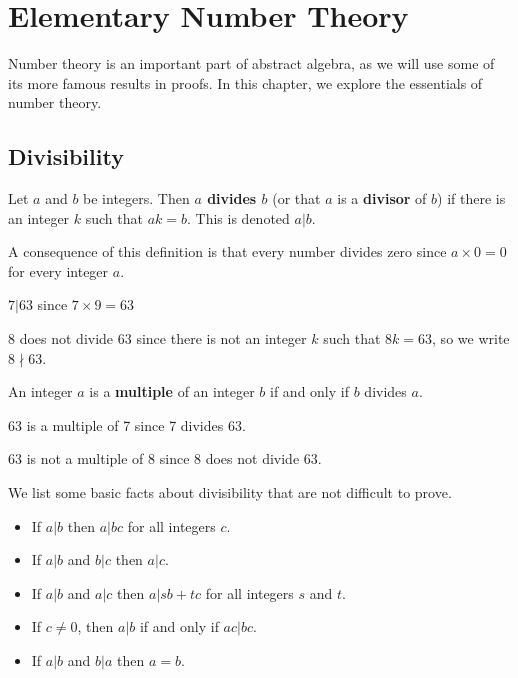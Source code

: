 \chapter{Elementary Number Theory}
Number theory is an important part of abstract algebra, as we will use some of its more famous results in proofs. In this chapter, we explore the essentials of number theory.

\section{Divisibility}
\begin{definition}
    Let $a$ and $b$ be integers. Then \textbf{$a$ divides $b$} (or that $a$ is a \textbf{divisor} of $b$) if there is an integer $k$ such that $ak = b$. This is denoted $a\vert b$.
\end{definition}
\begin{remark}
    A consequence of this definition is that every number divides zero since $a \times 0 = 0$ for every integer $a$.
\end{remark}
\begin{example}
    $7\vert 63$ since $7 \times 9 = 63$
\end{example}
\begin{example}
    8 does not divide 63 since there is not an integer $k$ such that $8k = 63$, so we write $8 \nmid 63$.
\end{example}

\begin{definition}
    An integer $a$ is a \textbf{multiple} of an integer $b$ if and only if $b$ divides $a$.
\end{definition}
\begin{example}
    63 is a multiple of 7 since 7 divides 63.
\end{example}
\begin{example}
    63 is not a multiple of 8 since 8 does not divide 63.
\end{example}

We list some basic facts about divisibility that are not difficult to prove.
\begin{itemize}
    \item If $a\vert b$ then $a\vert bc$ for all integers $c$.
    \item If $a\vert b$ and $b\vert c$ then $a\vert c$.
    \item If $a\vert b$ and $a\vert c$ then $a\vert sb+tc$ for all integers $s$ and $t$.
    \item If $c \neq 0$, then $a\vert b$ if and only if $ac\vert bc$.
    \item If $a \vert b$ and $b \vert a$ then $a = b$.
\end{itemize}

